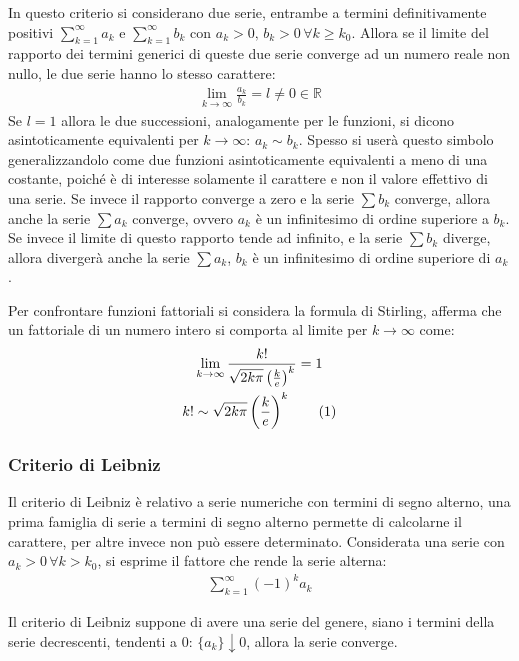 \documentclass{article}
\numberwithin{equation}{subsection}
\newcommand{\tageq}{\tag{\stepcounter{equation}\theequation}}
\begin{document}
In questo criterio si considerano due serie, entrambe a termini definitivamente positivi $\sum_{k=1}^\infty a_k$ e $\sum_{k=1}^\infty b_k$ con $a_k>0,\,b_k>0\,\forall k\geq k_0$. Allora se il limite del rapporto dei termini generici di queste due serie converge ad un numero reale non nullo, le due serie hanno lo stesso carattere:
\begin{gather*}
    \lim_{k\to\infty}\frac{a_k}{b_k}=l\neq0\in\mathbb{R}
\end{gather*}
Se $l=1$ allora le due successioni, analogamente per le funzioni, si dicono asintoticamente equivalenti per $k\to\infty$: $a_k\sim b_k$. 
Spesso si userà questo simbolo generalizzandolo come due funzioni asintoticamente equivalenti a meno di una costante, poiché è di interesse solamente il carattere e non il valore effettivo di una serie. 
Se invece il rapporto converge a zero e la serie $\sum b_k$ converge, allora anche la serie $\sum a_k$ converge, ovvero $a_k$ è un infinitesimo di ordine superiore a $b_k$. 
Se invece il limite di questo rapporto tende ad infinito, e la serie $\sum b_k$ diverge, allora divergerà anche la serie $\sum a_k$, $b_k$ è un infinitesimo di ordine superiore di $a_k$. 

Per confrontare funzioni fattoriali si considera la formula di Stirling, afferma che un fattoriale di un numero intero si comporta al limite per $k\to\infty$ come:
\begin{gather*}
    \displaystyle\lim_{k\to\infty}\frac{k!}{\sqrt{2k\pi}\left(\frac{k}{e}\right)^k}=1\\
    k!\sim\sqrt{2k\pi}\left(\frac{k}{e}\right)^k\tageq
\end{gather*}

\subsubsection{Criterio di Leibniz}

Il criterio di Leibniz è relativo a serie numeriche con termini di segno alterno, una prima famiglia di serie a termini di segno alterno permette di calcolarne il carattere, per altre invece non può essere determinato. Considerata una serie con $a_k>0\,\forall k>k_0$, si esprime il fattore che rende la serie alterna:
\begin{gather*}
    \displaystyle\sum_{k=1}^\infty(-1)^ka_k
\end{gather*}

Il criterio di Leibniz suppone di avere una serie del genere, siano i termini della serie decrescenti, tendenti a 0: $\{a_k\}\downarrow0$, allora la serie converge. 
\end{document}
